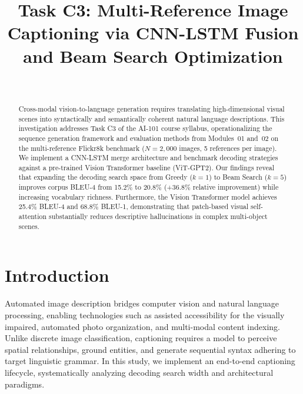 \documentclass[10pt,journal,compsoc,twocolumn]{IEEEtran}
\begin{document}
\title{Task C3: Multi-Reference Image Captioning via CNN-LSTM Fusion and Beam Search Optimization}

\author{
    \\
}

\maketitle

\begin{abstract}
Cross-modal vision-to-language generation requires translating high-dimensional visual scenes into syntactically and semantically coherent natural language descriptions. This investigation addresses Task C3 of the AI-101 course syllabus, operationalizing the sequence generation framework and evaluation methods from Modules~01 and~02 on the multi-reference Flickr8k benchmark ($N = 2,000$ images, 5 references per image). We implement a CNN-LSTM merge architecture and benchmark decoding strategies against a pre-trained Vision Transformer baseline (ViT-GPT2). Our findings reveal that expanding the decoding search space from Greedy ($k=1$) to Beam Search ($k=5$) improves corpus BLEU-4 from 15.2\% to 20.8\% (+36.8\% relative improvement) while increasing vocabulary richness. Furthermore, the Vision Transformer model achieves 25.4\% BLEU-4 and 68.8\% BLEU-1, demonstrating that patch-based visual self-attention substantially reduces descriptive hallucinations in complex multi-object scenes.
\end{abstract}

\section{Introduction}
Automated image description bridges computer vision and natural language processing, enabling technologies such as assisted accessibility for the visually impaired, automated photo organization, and multi-modal content indexing. Unlike discrete image classification, captioning requires a model to perceive spatial relationships, ground entities, and generate sequential syntax adhering to target linguistic grammar. In this study, we implement an end-to-end captioning lifecycle, systematically analyzing decoding search width and architectural paradigms.
\end{document}
